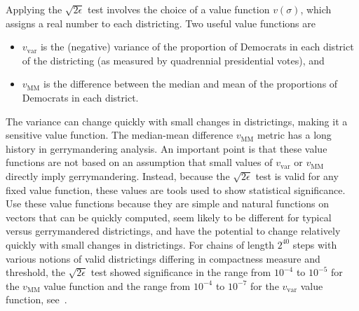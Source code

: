 \documentclass[12pt]{article}
\begin{document}
Applying the \( \sqrt{2\epsilon} \) test involves the choice of a value
function \( v(\sigma) \), which assigns a real number to each
districting.  Two useful value functions are
\begin{itemize}
    \item
        \( v_{\text{var}} \) is the (negative) variance of the
        proportion of Democrats in each district of the districting (as
        measured by quadrennial presidential votes), and
    \item
        \( v_{\text{MM}} \) is the difference between the median and
        mean of the proportions of Democrats in each district.
\end{itemize}
The variance can change quickly with small changes in districtings,
making it a sensitive value function.  The median-mean difference \( v_{\text
{MM}} \) metric has a long history in gerrymandering analysis.  An
important point is that these value functions are not based on an
assumption that small values of \( v_{\text {var}} \) or \( v_{\text{MM}}
\) directly imply gerrymandering.  Instead, because the \( \sqrt{2\epsilon}
\) test is valid for any fixed value function, these values are tools
used to show statistical significance.  Use these value functions
because they are simple and natural functions on vectors that can be
quickly computed, seem likely to be different for typical versus
gerrymandered districtings, and have the potential to change relatively
quickly with small changes in districtings.  For chains of length \( 2^{40}
\) steps with various notions of valid districtings differing in
compactness measure and threshold, the \( \sqrt{2\epsilon} \) test
showed significance in the range from \( 10^{-4} \) to \( 10^ {-5} \)
for the \( v_{\text {MM}} \) value function and the range from \( 10^{-4}
\) to \( 10^{-7} \) for the \( v_{\text{var}} \) value function,
see~\cite{chikina2860si}.
\end{document}
